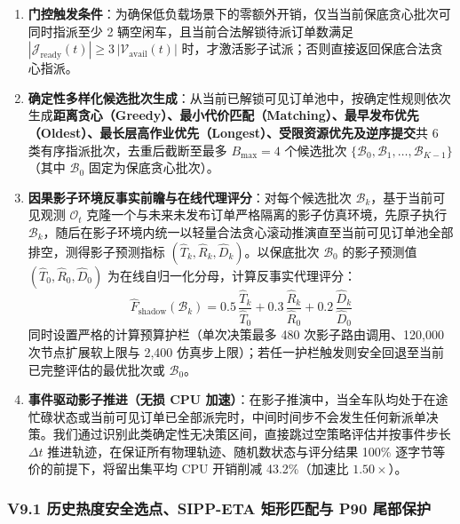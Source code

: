 \begin{enumerate}
  \item \textbf{门控触发条件}：为确保低负载场景下的零额外开销，仅当当前保底贪心批次可同时指派至少 2 辆空闲车，且当前合法解锁待派订单数满足 $|\mathcal{J}_{\text{ready}}(t)| \ge 3\,|\mathcal{V}_{\text{avail}}(t)|$ 时，才激活影子试派；否则直接返回保底合法贪心指派。
  \item \textbf{确定性多样化候选批次生成}：从当前已解锁可见订单池中，按确定性规则依次生成\textbf{距离贪心（Greedy）、最小代价匹配（Matching）、最早发布优先（Oldest）、最长层高作业优先（Longest）、受限资源优先及逆序提交}共 6 类有序指派批次，去重后截断至最多 $B_{\max}=4$ 个候选批次 $\{\mathcal{B}_0, \mathcal{B}_1, \dots, \mathcal{B}_{K-1}\}$（其中 $\mathcal{B}_0$ 固定为保底贪心批次）。
  \item \textbf{因果影子环境反事实前瞻与在线代理评分}：对每个候选批次 $\mathcal{B}_k$，基于当前可见观测 $\mathcal{O}_t$ 克隆一个与未来未发布订单严格隔离的影子仿真环境，先原子执行 $\mathcal{B}_k$，随后在影子环境内统一以轻量合法贪心滚动推演直至当前可见订单池全部排空，测得影子预测指标 $(\hat{T}_k, \hat{R}_k, \hat{D}_k)$。以保底批次 $\mathcal{B}_0$ 的影子预测值 $(\hat{T}_0, \hat{R}_0, \hat{D}_0)$ 为在线自归一化分母，计算反事实代理评分：
  \begin{equation}
    \hat{F}_{\text{shadow}}(\mathcal{B}_k) = 0.5\,\frac{\hat{T}_k}{\hat{T}_0} + 0.3\,\frac{\hat{R}_k}{\hat{R}_0} + 0.2\,\frac{\hat{D}_k}{\hat{D}_0}
    \label{eq:bcrd-proxy}
  \end{equation}
  同时设置严格的计算预算护栏（单次决策最多 480 次影子路由调用、120,000 次节点扩展软上限与 2,400 仿真步上限）；若任一护栏触发则安全回退至当前已完整评估的最优批次或 $\mathcal{B}_0$。
  \item \textbf{事件驱动影子推进（无损 CPU 加速）}：在影子推演中，当全车队均处于在途忙碌状态或当前可见订单已全部派完时，中间时间步不会发生任何新派单决策。我们通过识别此类确定性无决策区间，直接跳过空策略评估并按事件步长 $\Delta t$ 推进轨迹，在保证所有物理轨迹、随机数状态与评分结果 100\% 逐字节等价的前提下，将留出集平均 CPU 开销削减 43.2\%（加速比 $1.50\times$）。
\end{enumerate}

\subsubsection{V9.1 历史热度安全选点、SIPP-ETA 矩形匹配与 P90 尾部保护}

